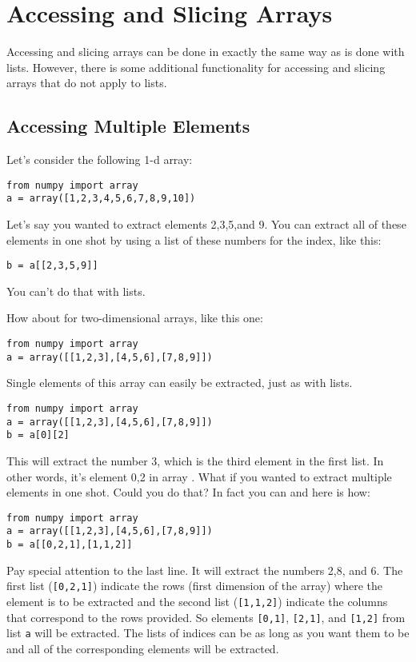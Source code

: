 \section{Accessing and Slicing Arrays}
Accessing and slicing arrays can be done in exactly the same way as is
done with lists.  However, there is some additional functionality for
accessing and slicing arrays that do not apply to lists.
\subsection*{Accessing Multiple Elements}
Let's consider the following 1-d array:
\begin{Verbatim}
from numpy import array
a = array([1,2,3,4,5,6,7,8,9,10])
\end{Verbatim}
Let's say you wanted to extract elements 2,3,5,and 9.  You can extract
all of these elements in one shot by using a list of these numbers for
the index, like this:
\begin{Verbatim}
b = a[[2,3,5,9]]
\end{Verbatim}
You can't do that with lists.

How about for two-dimensional arrays, like this one:
\begin{Verbatim}
from numpy import array
a = array([[1,2,3],[4,5,6],[7,8,9]])
\end{Verbatim}
Single elements of this array can easily be extracted, just as with
lists.
\begin{Verbatim}
from numpy import array
a = array([[1,2,3],[4,5,6],[7,8,9]])
b = a[0][2]
\end{Verbatim}
This will extract the number 3, which is the third element in the
first list.  In other words, it's element 0,2 in array .
What if you wanted to extract multiple elements in one shot.  Could
you do that?  In fact you can and here is how:
\begin{Verbatim}
from numpy import array
a = array([[1,2,3],[4,5,6],[7,8,9]])
b = a[[0,2,1],[1,1,2]]
\end{Verbatim}
Pay special attention to the last line.  It will extract the numbers
2,8, and 6.  The first list (\texttt{[0,2,1]}) indicate the rows
(first dimension of the array) where the element is to be extracted
and the second list (\texttt{[1,1,2]}) indicate the columns that
correspond to the rows provided.  So elements \texttt{[0,1]},
\texttt{[2,1]}, and \texttt{[1,2]} from list \texttt{a} will be
extracted.  The lists of indices can be as long as you want them to be
and all of the corresponding elements will be extracted.
